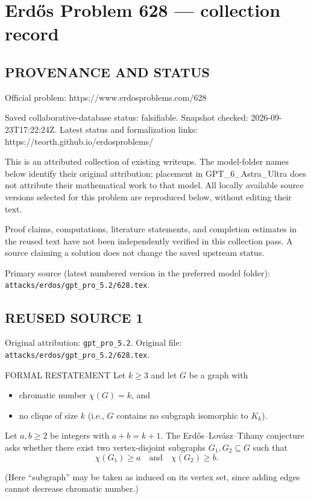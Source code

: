 \section*{Erd\H{o}s Problem 628 --- collection record}

\subsection*{PROVENANCE AND STATUS}
Official problem: https://www.erdosproblems.com/628

Saved collaborative-database status: falsifiable.
Snapshot checked: 2026-09-23T17:22:24Z.
Latest status and formalization links: https://teorth.github.io/erdosproblems/

This is an attributed collection of existing writeups. The model-folder names below identify their original attribution; placement in GPT\_6\_Astra\_Ultra does not attribute their mathematical work to that model. All locally available source versions selected for this problem are reproduced below, without editing their text.

Proof claims, computations, literature statements, and completion estimates in the reused text have not been independently verified in this collection pass. A source claiming a solution does not change the saved upstream status.

Primary source (latest numbered version in the preferred model folder): \texttt{attacks/erdos/gpt\_pro\_5.2/628.tex}.

\subsection*{REUSED SOURCE 1}
Original attribution: \texttt{gpt\_pro\_5.2}.
Original file: \texttt{attacks/erdos/gpt\_pro\_5.2/628.tex}.


FORMAL RESTATEMENT
Let $k\ge3$ and let $G$ be a graph with
\begin{itemize}
\item chromatic number $\chi(G)=k$, and
\item no clique of size $k$ (i.e., $G$ contains no subgraph isomorphic to $K_k$).
\end{itemize}
Let $a,b\ge2$ be integers with $a+b=k+1$.
The Erd\H{o}s--Lov\'asz--Tihany conjecture asks whether there exist two
vertex-disjoint subgraphs $G_1,G_2\subseteq G$ such that
\[
\chi(G_1)\ge a\quad\text{and}\quad \chi(G_2)\ge b.
\]

(Here ``subgraph'' may be taken as induced on its vertex set, since adding edges
cannot decrease chromatic number.)

